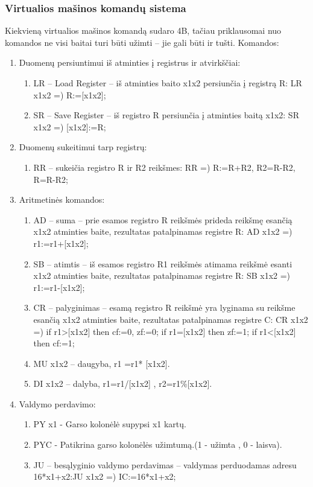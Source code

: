 \documentclass[oneside]{VUMIFPSkursinis}
\begin{document}
	\subsubsection{Virtualios mašinos komandų sistema}
Kiekvieną virtualios mašinos komandą sudaro 4B, tačiau priklausomai nuo komandos ne visi
baitai turi būti užimti – jie gali būti ir tušti.
Komandos:
\begin{enumerate}
\item Duomenų persiuntimui iš atminties į registrus ir atvirkščiai:
\begin{enumerate}
\item  LR – Load Register – iš atminties baito x1x2 persiunčia į registrą R:
LR x1x2 =) R:=[x1x2];
\item SR – Save Register – iš registro R persiunčia į atminties baitą x1x2:
SR x1x2 =) [x1x2]:=R;
\end{enumerate}
\item Duomenų sukeitimui tarp registrų:
\begin{enumerate}
\item RR – sukeičia registro R ir R2 reikšmes:
RR =) R:=R+R2, R2=R-R2, R=R-R2;
\end{enumerate}
\item Aritmetinės komandos:
\begin{enumerate}
\item AD – suma – prie esamos registro R reikšmės prideda reikšmę esančią x1x2 atminties
baite, rezultatas patalpinamas registre R:
AD x1x2 =) r1:=r1+[x1x2];
\item SB – atimtis – iš esamos registro R1 reikšmės atimama reikšmė esanti x1x2 atminties
baite, rezultatas patalpinamas registre R:
SB x1x2 =) r1:=r1-[x1x2];
\item CR – palyginimas – esamą registro R reikšmė yra lyginama su reikšme esančią x1x2
atminties baite, rezultatas patalpinamas registre C:
CR x1x2 =)
if r1>[x1x2] then cf:=0, zf:=0;
if r1=[x1x2] then zf:=1;
if r1<[x1x2] then cf:=1;
\item MU x1x2 – daugyba, r1 =r1* [x1x2].
\item DI x1x2 – dalyba, r1=r1/[x1x2] , r2=r1\%[x1x2].
\end{enumerate}
\item Valdymo perdavimo:
\begin{enumerate}
\item PY x1 - Garso kolonėlė supypsi x1 kartų.
\item PYC - Patikrina garso kolonėlės užimtumą.(1 - užimta , 0 - laisva).
\item JU – besąlyginio valdymo perdavimas – valdymas perduodamas adresu 16*x1+x2:JU x1x2 =) IC:=16*x1+x2;

\end{enumerate}
\end{enumerate}
\end{document}
